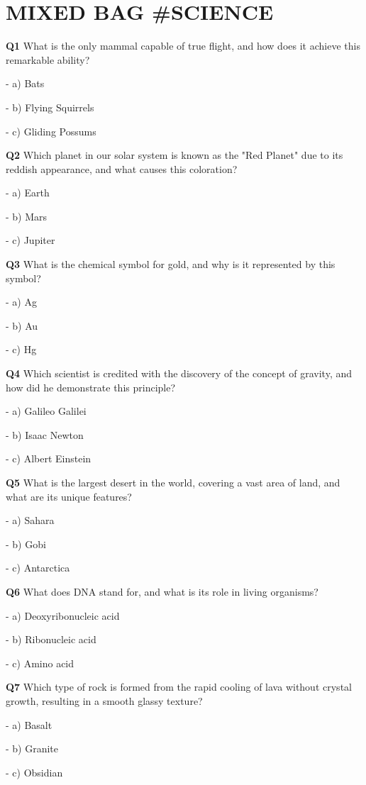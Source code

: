 \section{MIXED BAG #SCIENCE}

\textbf{Q1} What is the only mammal capable of true flight, and how does it achieve this remarkable ability?\par
\quad - a) Bats\par
\quad - b) Flying Squirrels\par
\quad - c) Gliding Possums\par

\textbf{Q2} Which planet in our solar system is known as the "Red Planet" due to its reddish appearance, and what causes this coloration?\par
\quad - a) Earth\par
\quad - b) Mars\par
\quad - c) Jupiter\par

\textbf{Q3} What is the chemical symbol for gold, and why is it represented by this symbol?\par
\quad - a) Ag\par
\quad - b) Au\par
\quad - c) Hg\par

\textbf{Q4} Which scientist is credited with the discovery of the concept of gravity, and how did he demonstrate this principle?\par
\quad - a) Galileo Galilei\par
\quad - b) Isaac Newton\par
\quad - c) Albert Einstein\par

\textbf{Q5} What is the largest desert in the world, covering a vast area of land, and what are its unique features?\par
\quad - a) Sahara\par
\quad - b) Gobi\par
\quad - c) Antarctica\par

\textbf{Q6} What does DNA stand for, and what is its role in living organisms?\par
\quad - a) Deoxyribonucleic acid\par
\quad - b) Ribonucleic acid\par
\quad - c) Amino acid\par

\textbf{Q7} Which type of rock is formed from the rapid cooling of lava without crystal growth, resulting in a smooth glassy texture?\par
\quad - a) Basalt\par
\quad - b) Granite\par
\quad - c) Obsidian\par

